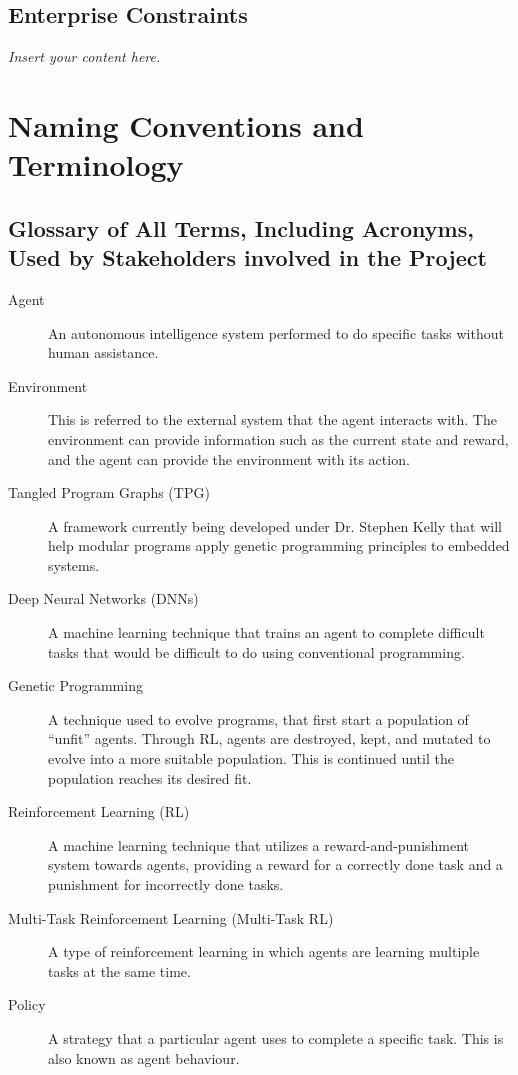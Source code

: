 \documentclass[12pt]{article}
\newcommand{\lips}{\textit{Insert your content here.}}
\begin{document}
\subsection{Enterprise Constraints}
\lips

\section{Naming Conventions and Terminology}
\subsection{Glossary of All Terms, Including Acronyms, Used by Stakeholders
involved in the Project}
\begin{description}
  \item [Agent]\label{def:agent} An autonomous intelligence system performed to do specific tasks without human assistance.
  \item [Environment]\label{def:environment} This is referred to the external system that the agent interacts with. The environment can provide information such as the current state and reward, and the agent can provide the environment with its action.
  \item [Tangled Program Graphs (TPG)]\label{def:tpg} A framework currently being developed under Dr. Stephen Kelly that will help modular programs apply genetic programming principles to embedded systems.
  \item [Deep Neural Networks (DNNs)]\label{def:dnn} A machine learning technique that trains an agent to complete difficult tasks that would be difficult to do using conventional programming.
  \item [Genetic Programming]\label{def:genetic_programming} A technique used to evolve programs, that first start a population of “unfit” agents. Through RL, agents are destroyed, kept, and mutated to evolve into a more suitable population. This is continued until the population reaches its desired fit.
  \item [Reinforcement Learning (RL)]\label{def:rl} A machine learning technique that utilizes a reward-and-punishment system towards agents, providing a reward for a correctly done task and a punishment for incorrectly done tasks.
  \item [Multi-Task Reinforcement Learning (Multi-Task RL)]\label{def:mulittask_rl} A type of reinforcement learning in which agents are learning multiple tasks at the same time.
  \item [Policy]\label{def:policy} A strategy that a particular agent uses to complete a specific task. This is also known as agent behaviour. 

\end{description}
\end{document}
